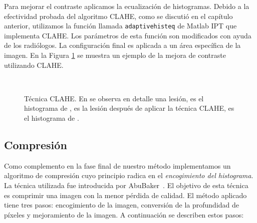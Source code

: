 Para mejorar el contraste aplicamos la ecualización de histogramas. Debido a la
efectividad probada del algoritmo CLAHE, como se discutió en el capítulo
anterior, utilizamos la función llamada \texttt{adaptivehisteq} de Matlab IPT
que implementa CLAHE. Los parámetros de esta función son modificados con ayuda
de los radiólogos. La configuración final es aplicada a un área específica de
la imagen. En la Figura \ref{img:clahe} se muestra un ejemplo de la mejora de
contraste utilizando CLAHE.

\begin{figure}[h!]
  \begin{center}
    \hspace{12pt}
    \\
    \hspace{12pt}
  \end{center} 

  \caption[Técnica CLAHE]{Técnica CLAHE. En \protect{} se observa
  en detalle una lesión, \protect{} es el histograma de
  \protect{}, \protect{} es la lesión después de
  aplicar la técnica CLAHE, \protect{} es el histograma de
  \protect{}.} 

  \label{img:clahe} 
\end{figure}

\subsection{Compresión}
\label{compression}

Como complemento en la fase final de nuestro método implementamos un algoritmo
de compresión cuyo principio radica en el \textit{encogimiento del histograma}.
La técnica utilizada fue introducida por AbuBaker~\cite{abubaker2006mammogram,
abubaker2007efficient}. El objetivo de esta técnica es comprimir una imagen
con la menor pérdida de calidad. El método aplicado tiene tres pasos:
encogimiento de la imagen, conversión de la profundidad de píxeles y
mejoramiento de la imagen. A continuación se describen estos pasos:

